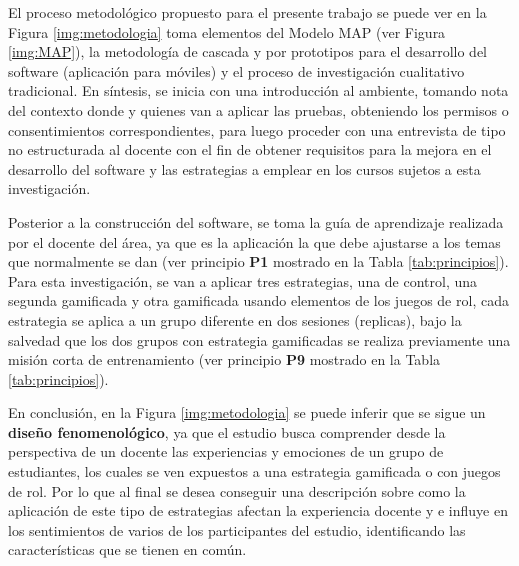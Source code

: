 El proceso metodológico propuesto para el presente trabajo se puede ver en la Figura \ref{img:metodologia} 
toma elementos del Modelo MAP (ver Figura \ref{img:MAP}), la metodología de cascada y por prototipos para el 
desarrollo del software (aplicación para móviles) y el proceso de investigación cualitativo tradicional. En 
síntesis, se inicia con una introducción al ambiente, tomando nota del contexto donde y quienes van a aplicar 
las pruebas, obteniendo los permisos o consentimientos correspondientes, para luego proceder con una 
entrevista de tipo no estructurada al docente con el fin de obtener requisitos para la mejora en el desarrollo 
del software y las estrategias a emplear en los cursos sujetos a esta investigación.

Posterior a la construcción del software, se toma la guía de aprendizaje realizada por el docente del área,
ya que es la aplicación la que debe ajustarse a los temas que normalmente se dan (ver principio \textbf{P1} 
mostrado en la Tabla \ref{tab:principios}). Para esta investigación, se van a aplicar tres estrategias, una de
control, una segunda gamificada y otra gamificada usando elementos de los juegos de rol, cada estrategia se
aplica a un grupo diferente en dos sesiones (replicas), bajo la salvedad que los dos grupos con estrategia 
gamificadas se realiza previamente una misión corta de entrenamiento (ver principio \textbf{P9} mostrado en la 
Tabla \ref{tab:principios}).

En conclusión, en la Figura \ref{img:metodologia} se puede inferir que se sigue un \textbf{diseño 
fenomenológico}, ya que el estudio busca comprender desde la perspectiva de un docente las experiencias y 
emociones de un grupo de estudiantes, los cuales se ven expuestos a una estrategia gamificada o con juegos de 
rol. Por lo que al final se desea conseguir una descripción sobre como la aplicación de este tipo de 
estrategias afectan la experiencia docente y e influye en los sentimientos de varios de los participantes del 
estudio, identificando las características que se tienen en común.

